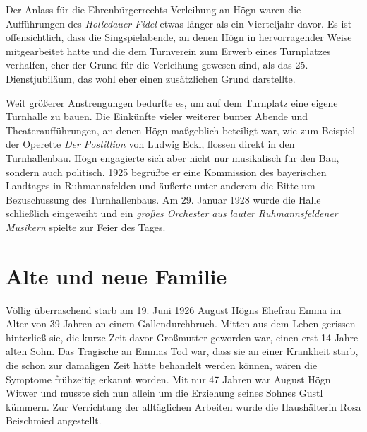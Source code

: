 \documentclass{book}
\newcommand{\zitat}[1]{\textit{#1}}
\begin{document}
Der Anlass für die Ehrenbürgerrechts-Verleihung an Högn waren die
Aufführungen des \textit{Holledauer Fidel} etwas länger als ein
Vierteljahr davor. Es ist offensichtlich, dass die Singspielabende, an
denen Högn in hervorragender Weise mitgearbeitet hatte und die dem
Turnverein zum Erwerb eines Turn\-platzes verhalfen, eher der Grund für
die Verleihung gewesen sind, als das 25. Dienstjubiläum, das wohl eher
einen zusätzlichen Grund darstellte.

 


Weit größerer Anstrengungen bedurfte es, um auf dem Turnplatz eine
eigene Turnhalle zu bauen. Die Einkünfte vieler weiterer bunter Abende
und Theateraufführungen, an denen Högn maßgeblich beteiligt war, wie
zum Beispiel der Operette \textit{Der Postillion} von Ludwig Eckl,
flossen direkt in den Turn\-hallenbau. Högn engagierte sich aber nicht
nur musikalisch für den Bau, son\-dern auch politisch. 1925 begrüßte er
eine Kommission des bayerischen Landtages in Ruhmannsfelden und äußerte
unter anderem die Bitte um Bezu\-schussung des Turnhallenbaus. Am 29.
Januar 1928 wurde die Halle schließ\-lich eingeweiht und ein
\zitat{großes Orchester aus lauter Ruhmannsfeldener Musikern
}spielte zur Feier des Tages.


\section{Alte und neue Familie}

Völlig überraschend starb am 19. Juni 1926 August Högns Ehefrau Emma im
Alter von 39 Jahren an einem Gallendurchbruch. Mitten aus dem Leben
geris\-sen hinterließ sie, die kurze Zeit davor Großmutter geworden
war, einen erst 14 Jahre alten Sohn. Das Tragische an Emmas Tod war,
dass sie an einer Krankheit starb, die schon zur damaligen Zeit hätte
behandelt werden können, wären die Symptome frühzeitig erkannt worden.
Mit nur 47 Jahren war August Högn Witwer und musste sich nun allein um
die Erziehung seines Sohnes Gustl kümmern. Zur Verrichtung der
alltäglichen Arbeiten wurde die Haushälterin Rosa Beischmied
angestellt.
\end{document}
